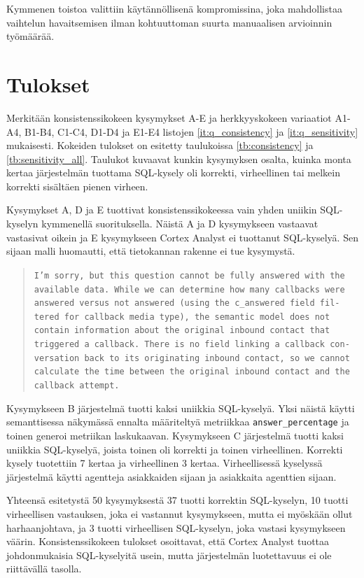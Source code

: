 Kymmenen toistoa valittiin käytännöllisenä kompromissina, joka mahdollistaa vaihtelun havaitsemisen ilman kohtuuttoman suurta manuaalisen arvioinnin työmäärää.

\section{Tulokset}
Merkitään konsistenssikokeen kysymykset A-E ja herkkyyskokeen variaatiot A1-A4, B1-B4, C1-C4, D1-D4 ja E1-E4 listojen \ref{it:q_consistency} ja \ref{it:q_sensitivity} mukaisesti. Kokeiden tulokset on esitetty taulukoissa \ref{tb:consistency} ja \ref{tb:sensitivity_all}. Taulukot kuvaavat kunkin kysymyksen osalta, kuinka monta kertaa järjestelmän tuottama SQL-kysely oli korrekti, virheellinen tai melkein korrekti sisältäen pienen virheen.

Kysymykset A, D ja E tuottivat konsistenssikokeessa vain yhden uniikin SQL-kyselyn kymmenellä suorituksella. Näistä A ja D kysymykseen vastaavat vastasivat oikein ja E kysymykseen Cortex Analyst ei tuottanut SQL-kyselyä. Sen sijaan malli huomautti, että tietokannan rakenne ei tue kysymystä.

\begin{quote}
  \texttt{I'm sorry, but this question cannot be fully answered with the available data. While we can determine how many callbacks were answered versus not answered (using the c\_answered field fil-\\tered for callback media type), the semantic model does not \\ contain information about the original inbound contact that \\ triggered a callback. There is no field linking a callback con-\\versation back to its originating inbound contact, so we cannot calculate the time between the original inbound contact and the callback attempt.}
\end{quote}

Kysymykseen B järjestelmä tuotti kaksi uniikkia SQL-kyselyä. Yksi näistä käytti semanttisessa näkymässä ennalta määriteltyä metriikkaa \texttt{answer\_percentage} ja toinen generoi metriikan laskukaavan. Kysymykseen C järjestelmä tuotti kaksi uniikkia SQL-kyselyä, joista toinen oli korrekti ja toinen virheellinen. Korrekti kysely tuotettiin 7 kertaa ja virheellinen 3 kertaa. Virheellisessä kyselyssä järjestelmä käytti agentteja asiakkaiden sijaan ja asiakkaita agenttien sijaan.

Yhteensä esitetystä 50 kysymyksestä 37 tuotti korrektin SQL-kyselyn, 10 tuotti virheellisen vastauksen, joka ei vastannut kysymykseen, mutta ei myöskään ollut harhaanjohtava, ja 3 tuotti virheellisen SQL-kyselyn, joka vastasi kysymykseen väärin. Konsistenssikokeen tulokset osoittavat, että Cortex Analyst tuottaa johdonmukaisia SQL-kyselyitä usein, mutta järjestelmän luotettavuus ei ole riittävällä tasolla.

